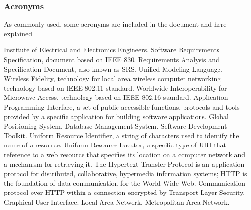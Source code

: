 \subsubsection{Acronyms}
As commonly used, some acronyms are included in the document and here explained:
\begin{itemize}
	 Institute of Electrical and Electronics Engineers.
	 Software Requirements Specification, document based on IEEE 830.
	 Requirements Analysis and Specification Document, also known as SRS.
	 Unified Modeling Language.
	 Wireless Fidelity, technology for local area wireless computer networking technology based on IEEE 802.11 standard.
	 Worldwide Interoperability for Microwave Access, technology based on IEEE 802.16 standard.
	 Application Programming Interface, a set of public accessible functions, protocols and tools provided by a specific application for building software applications.
	 Global Positioning System.
	 Database Management System.
	 Software Development Toolkit.
	 Uniform Resource Identifier, a string of characters used to identify the name of a resource.
	 Uniform Resource Locator, a specific type of URI that reference to a web resource that specifies its location on a computer network and a mechanism for retrieving it.
	 The Hypertext Transfer Protocol is an application protocol for distributed, collaborative, hypermedia information systems; HTTP is the foundation of data communication for the World Wide Web.
	 Communication protocol over HTTP within a connection encrypted by Transport Layer Security.
	 Graphical User Interface.
	 Local Area Network.
	 Metropolitan Area Network.
\end{itemize}
